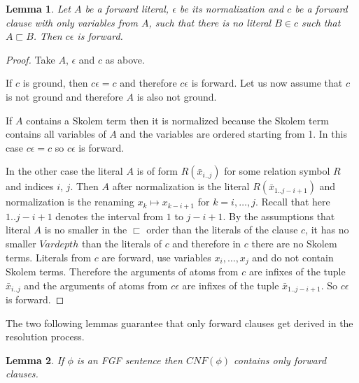 \documentclass[english, shortabstract]{iithesis}
\theoremstyle{definition} \newtheorem{definition}{Definition}[chapter]
\theoremstyle{remark} \newtheorem{remark}[definition]{Observation}
\theoremstyle{plain} \newtheorem{theorem}[definition]{Theorem}
\theoremstyle{plain} \newtheorem{lemma}[definition]{Lemma}
\begin{document}
\begin{lemma}\label{lem:normalization}
Let $A$ be a forward literal, $\epsilon$ be its normalization and $c$ be a forward clause with only variables from $A$, 
such that there is no literal $B\in c$ such that $A\sqsubset B$.
Then $c\epsilon$ is forward.
\end{lemma}
\begin{proof}
Take $A$, $\epsilon$ and $c$ as above.

If $c$ is ground, then $c\epsilon=c$ and therefore $c\epsilon$ is forward.
Let us now assume that $c$ is not ground and therefore $A$ is also not ground.

If $A$ contains a Skolem term then it is normalized
because the Skolem term contains all variables of $A$ and the variables are ordered starting from 1.
In this case $c\epsilon=c$ so $c\epsilon$ is forward.

In the other case the literal $A$ is of form $R(\bar{x}_{i..j})$ for some relation symbol $R$ and indices $i$, $j$.
Then $A$ after normalization is the literal $R(\bar{x}_{1..j-i+1})$ and normalization is the renaming $x_k\mapsto x_{k-i+1}$ for $k=i,\dots,j$.
Recall that here $1..j-i+1$ denotes the interval from $1$ to $j-i+1$.
By the assumptions that literal $A$ is no smaller in the $\sqsubset$ order than the literals of the clause $c$, 
it has no smaller $\mathit{Vardepth}$ than the literals of $c$ and therefore in $c$ there are no Skolem terms.
Literals from $c$ are forward, use variables $x_i, \dots, x_j$ and do not contain Skolem terms.
Therefore the arguments of atoms from $c$ are infixes of the tuple $\bar{x}_{i..j}$ and 
the arguments of atoms from $c\epsilon$ are infixes of the tuple $\bar{x}_{1..j-i+1}$.
So $c\epsilon$ is forward.
\end{proof}

The two following lemmas guarantee that only forward clauses get derived in the resolution process.
\begin{lemma}\label{lem:basis}
If $\phi$ is an FGF sentence then $\mathit{CNF}(\phi)$ contains only forward clauses.
\end{lemma}
\end{document}
